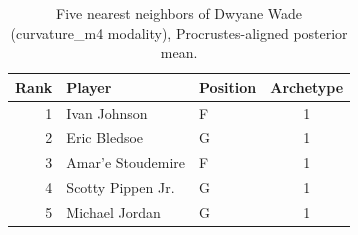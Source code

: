 \begin{table}[htbp]
  \centering\small
  \begin{tabular}{rllc}
    \toprule
    Rank & Player & Position & Archetype \\
    \midrule
    1 & Ivan Johnson & F & 1 \\
    2 & Eric Bledsoe & G & 1 \\
    3 & Amar'e Stoudemire & F & 1 \\
    4 & Scotty Pippen Jr. & G & 1 \\
    5 & Michael Jordan & G & 1 \\
    \bottomrule
  \end{tabular}
  \caption{Five nearest neighbors of Dwyane Wade (curvature_m4 modality), Procrustes-aligned posterior mean.}
  \label{tab:Dwyane_Wade_neighbors_curvature_m4}
\end{table}

